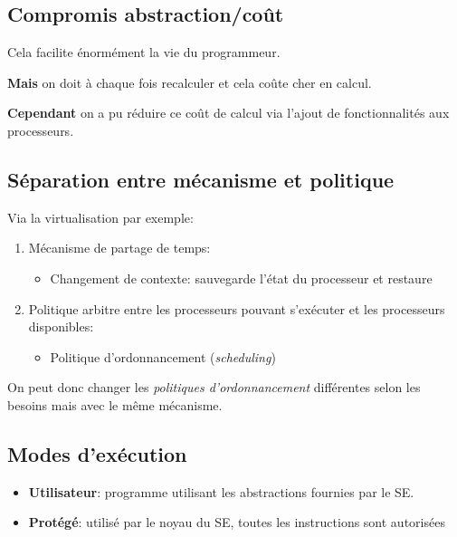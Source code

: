 \subsection{Compromis
abstraction/coût}\label{compromis-abstractioncouxfbt}

Cela facilite énormément la vie du programmeur.

\textbf{Mais} on doit à chaque fois recalculer et cela coûte cher en
calcul.

\textbf{Cependant} on a pu réduire ce coût de calcul via l'ajout de
fonctionnalités aux processeurs.

\subsection{Séparation entre mécanisme et
politique}\label{suxe9paration-entre-muxe9canisme-et-politique}

Via la virtualisation par exemple:

\begin{enumerate}
\def\labelenumi{\arabic{enumi}.}
\tightlist
\item
  Mécanisme de partage de temps:

  \begin{itemize}
  \tightlist
  \item
    Changement de contexte: sauvegarde l'état du processeur et restaure
  \end{itemize}
\item
  Politique arbitre entre les processeurs pouvant s'exécuter et les
  processeurs disponibles:

  \begin{itemize}
  \tightlist
  \item
    Politique d'ordonnancement (\emph{scheduling})
  \end{itemize}
\end{enumerate}

On peut donc changer les \emph{politiques d'ordonnancement} différentes
selon les besoins mais avec le même mécanisme.

\subsection{Modes d'exécution}\label{modes-dexuxe9cution}

\begin{itemize}
\tightlist
\item
  \textbf{Utilisateur}: programme utilisant les abstractions fournies
  par le SE.
\item
  \textbf{Protégé}: utilisé par le noyau du SE, toutes les instructions
  sont autorisées
\end{itemize}

